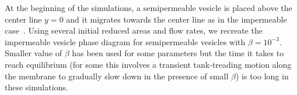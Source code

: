 \documentclass[prb,preprint,showpacs,preprintnumbers,amsmath,amssymb,longbibliography]{revtex4-1}
\begin{document}
%
%
%
%
%
%

At the beginning of the simulations, a semipermeable vesicle is placed
above the center line $y=0$ and it migrates towards the center line as
in the impermeable case~\cite{dan-vla-mis2009}. 
%
%
%
Using several initial reduced areas and flow rates, we recreate the
impermeable vesicle phase diagram for semipermeable vesicles with $\beta
= 10^{-3}$. Smaller value of $\beta$ has been used for some parameters but the time 
it takes to reach equilibrium (for some this involves a transient tank-treading
motion along the membrane to gradually slow down in the presence of small $\beta$) is too long in these simulations.
\end{document}
